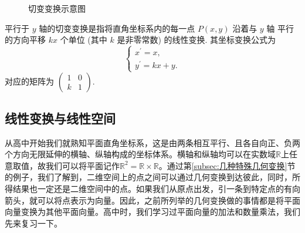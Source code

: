 \begin{figure}[h]
\centering
{}
\caption{切变变换示意图\label{fig:切变变换}}
\end{figure}

\begin{exercise}

    平行于 $y$ 轴的切变变换是指将直角坐标系内的每一点 $P(x, y)$ 沿着与 $y$ 轴 平行的方向平移 $k x$ 个单位 (其中 $k$ 是非零常数) 的线性变换. 其坐标变换公式为
    $$
    \left\{\begin{array}{c}
    x^{\prime}=x, \\
    y^{\prime}=k x+y .
    \end{array}\right.
    $$
    对应的矩阵为 $\left(\begin{array}{ll}1 & 0 \\ k & 1\end{array}\right)$.
        
\end{exercise}

\subsection{线性变换与线性空间}

从高中开始我们就熟知平面直角坐标系，这是由两条相互平行、且各自向正、负两个方向无限延伸的横轴、纵轴构成的坐标体系。横轴和纵轴均可以在实数域$\mathbb{R}$上任意取值，故我们可以将平面记作$\mathbb{R}^2 = \mathbb{R}\times\mathbb{R}$。通过第\ref{subsec:几种特殊几何变换}节的例子，我们了解到，二维空间上的点之间可以通过几何变换到达彼此，同时，所得结果也一定还是二维空间中的点。如果我们从原点出发，引一条到特定点的有向箭头，就可以将点表示为向量。因此，之前所列举的几何变换做的事情都是将平面向量变换为其他平面向量。高中时，我们学习过平面向量的加法和数量乘法，我们先来复习一下。

